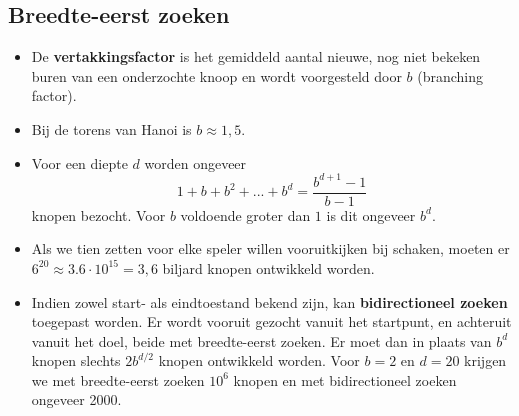 \subsection{Breedte-eerst zoeken}
\begin{itemize}
	\item De \textbf{vertakkingsfactor} is het gemiddeld aantal nieuwe, nog niet bekeken buren van een onderzochte knoop en wordt voorgesteld door $b$ (branching factor).
	\item Bij de torens van Hanoi is $b \approx 1,5$.
	\item Voor een diepte $d$ worden ongeveer 
	$$1 + b + b^2 + ... + b^d = \frac{b^{d + 1} - 1}{b - 1}$$
	knopen bezocht. Voor $b$ voldoende groter dan $1$ is dit ongeveer $b^d$.
	\item Als we tien zetten voor elke speler willen vooruitkijken bij schaken, moeten er $6^{20} \approx 3.6\cdot10^{15} = 3,6$ biljard knopen ontwikkeld worden.
	\item Indien zowel start- als eindtoestand bekend zijn, kan \textbf{bidirectioneel zoeken} toegepast worden. Er wordt vooruit gezocht vanuit het startpunt, en achteruit vanuit het doel, beide met breedte-eerst zoeken. Er moet dan in plaats van $b^d$ knopen slechts $2b^{d/2}$ knopen ontwikkeld worden. Voor $b = 2$ en $d = 20$ krijgen we met breedte-eerst zoeken $10^6$ knopen en met bidirectioneel zoeken ongeveer 2000.
\end{itemize}
